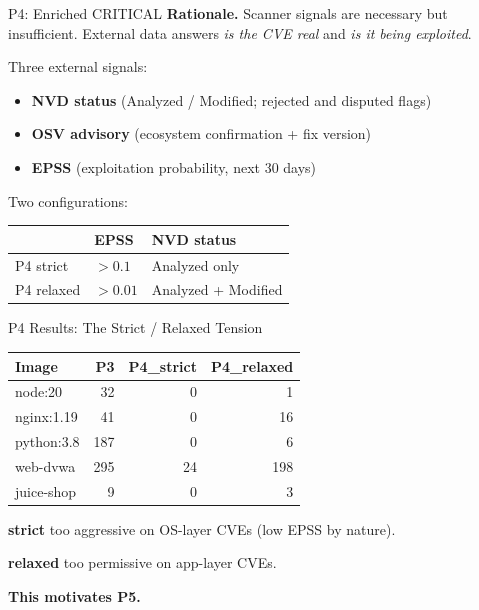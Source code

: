\documentclass[aspectratio=169]{beamer}
\begin{document}
\begin{frame}{P4: Enriched CRITICAL}
\textbf{Rationale.} Scanner signals are necessary but insufficient. External data answers \emph{is the CVE real} and \emph{is it being exploited}.

\medskip
Three external signals:
\begin{itemize}
  \item \textbf{NVD status} (Analyzed / Modified; rejected and disputed flags)
  \item \textbf{OSV advisory} (ecosystem confirmation + fix version)
  \item \textbf{EPSS} (exploitation probability, next 30 days)
\end{itemize}

\medskip
Two configurations:

\begin{tabular}{lll}
\toprule
& EPSS & NVD status \\
\midrule
P4 strict & $> 0.1$ & Analyzed only \\
P4 relaxed & $> 0.01$ & Analyzed + Modified \\
\bottomrule
\end{tabular}
\end{frame}

\begin{frame}{P4 Results: The Strict / Relaxed Tension}
\small
\begin{tabular}{lrrr}
\toprule
Image & P3 & P4\_strict & P4\_relaxed \\
\midrule
node:20 & 32 & 0 & 1 \\
nginx:1.19 & 41 & 0 & 16 \\
python:3.8 & 187 & 0 & 6 \\
web-dvwa & 295 & 24 & 198 \\
juice-shop & 9 & 0 & 3 \\
\bottomrule
\end{tabular}

\medskip
\textbf{strict} too aggressive on OS-layer CVEs (low EPSS by nature).

\textbf{relaxed} too permissive on app-layer CVEs.

\medskip
\textcolor{accent}{\textbf{This motivates P5.}}
\end{frame}
\end{document}
